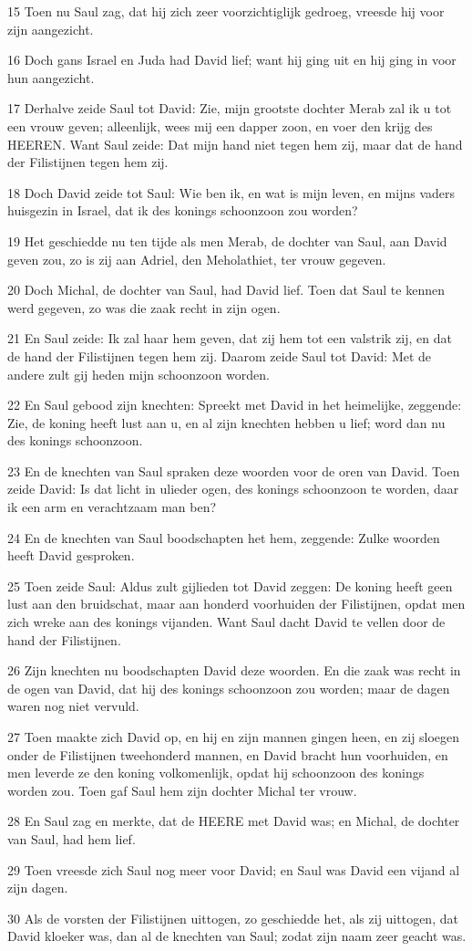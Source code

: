 \par 15 Toen nu Saul zag, dat hij zich zeer voorzichtiglijk gedroeg, vreesde hij voor zijn aangezicht.
\par 16 Doch gans Israel en Juda had David lief; want hij ging uit en hij ging in voor hun aangezicht.
\par 17 Derhalve zeide Saul tot David: Zie, mijn grootste dochter Merab zal ik u tot een vrouw geven; alleenlijk, wees mij een dapper zoon, en voer den krijg des HEEREN. Want Saul zeide: Dat mijn hand niet tegen hem zij, maar dat de hand der Filistijnen tegen hem zij.
\par 18 Doch David zeide tot Saul: Wie ben ik, en wat is mijn leven, en mijns vaders huisgezin in Israel, dat ik des konings schoonzoon zou worden?
\par 19 Het geschiedde nu ten tijde als men Merab, de dochter van Saul, aan David geven zou, zo is zij aan Adriel, den Meholathiet, ter vrouw gegeven.
\par 20 Doch Michal, de dochter van Saul, had David lief. Toen dat Saul te kennen werd gegeven, zo was die zaak recht in zijn ogen.
\par 21 En Saul zeide: Ik zal haar hem geven, dat zij hem tot een valstrik zij, en dat de hand der Filistijnen tegen hem zij. Daarom zeide Saul tot David: Met de andere zult gij heden mijn schoonzoon worden.
\par 22 En Saul gebood zijn knechten: Spreekt met David in het heimelijke, zeggende: Zie, de koning heeft lust aan u, en al zijn knechten hebben u lief; word dan nu des konings schoonzoon.
\par 23 En de knechten van Saul spraken deze woorden voor de oren van David. Toen zeide David: Is dat licht in ulieder ogen, des konings schoonzoon te worden, daar ik een arm en verachtzaam man ben?
\par 24 En de knechten van Saul boodschapten het hem, zeggende: Zulke woorden heeft David gesproken.
\par 25 Toen zeide Saul: Aldus zult gijlieden tot David zeggen: De koning heeft geen lust aan den bruidschat, maar aan honderd voorhuiden der Filistijnen, opdat men zich wreke aan des konings vijanden. Want Saul dacht David te vellen door de hand der Filistijnen.
\par 26 Zijn knechten nu boodschapten David deze woorden. En die zaak was recht in de ogen van David, dat hij des konings schoonzoon zou worden; maar de dagen waren nog niet vervuld.
\par 27 Toen maakte zich David op, en hij en zijn mannen gingen heen, en zij sloegen onder de Filistijnen tweehonderd mannen, en David bracht hun voorhuiden, en men leverde ze den koning volkomenlijk, opdat hij schoonzoon des konings worden zou. Toen gaf Saul hem zijn dochter Michal ter vrouw.
\par 28 En Saul zag en merkte, dat de HEERE met David was; en Michal, de dochter van Saul, had hem lief.
\par 29 Toen vreesde zich Saul nog meer voor David; en Saul was David een vijand al zijn dagen.
\par 30 Als de vorsten der Filistijnen uittogen, zo geschiedde het, als zij uittogen, dat David kloeker was, dan al de knechten van Saul; zodat zijn naam zeer geacht was.

